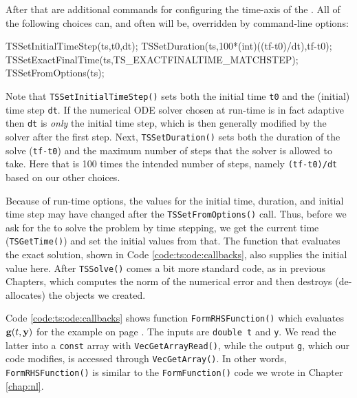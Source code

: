 After that are additional commands for configuring the time-axis of the \pTS.  All of the following choices can, and often will be, overridden by command-line options:
\begin{code}
  TSSetInitialTimeStep(ts,t0,dt);
  TSSetDuration(ts,100*(int)((tf-t0)/dt),tf-t0);
  TSSetExactFinalTime(ts,TS_EXACTFINALTIME_MATCHSTEP);
  TSSetFromOptions(ts);
\end{code}
Note that \texttt{TSSetInitialTimeStep()} sets both the initial time \texttt{t0} and the (initial) time step \texttt{dt}.  If the numerical ODE solver chosen at run-time is in fact adaptive then \texttt{dt} is \emph{only} the initial time step, which is then generally modified by the solver after the first step.  Next, \texttt{TSSetDuration()} sets both the duration of the solve (\texttt{tf-t0}) and the maximum number of steps that the solver is allowed to take.  Here that is 100 times the intended number of steps, namely \texttt{(tf-t0)/dt} based on our other choices.

Because of run-time options, the values for the initial time, duration, and initial time step may have changed after the \texttt{TSSetFromOptions()} call.  Thus, before we ask for the \pTS to solve the problem by time stepping, we get the current time (\texttt{TSGetTime()}) and set the initial values from that.  The function that evaluates the exact solution, shown in Code \ref{code:ts:ode:callbacks}, also supplies the initial value here.  After \texttt{TSSolve()} comes a bit more standard code, as in previous Chapters, which computes the norm of the numerical error and then destroys (de-allocates) the objects we created.

Code \ref{code:ts:ode:callbacks} shows function \texttt{FormRHSFunction()} which evaluates $\mathbf{g}(t,\mathbf{y})$ for the example on page \pageref{ex:ts:odeeasy}.  The inputs are \texttt{double t} and \pVec \texttt{y}.  We read the latter into a \texttt{const} array with \texttt{VecGetArrayRead()}, while the output \pVec \texttt{g}, which our code modifies, is accessed through \texttt{VecGetArray()}.  In other words, \texttt{FormRHSFunction()} is similar to the \texttt{FormFunction()} code we wrote in Chapter \ref{chap:nl}.



